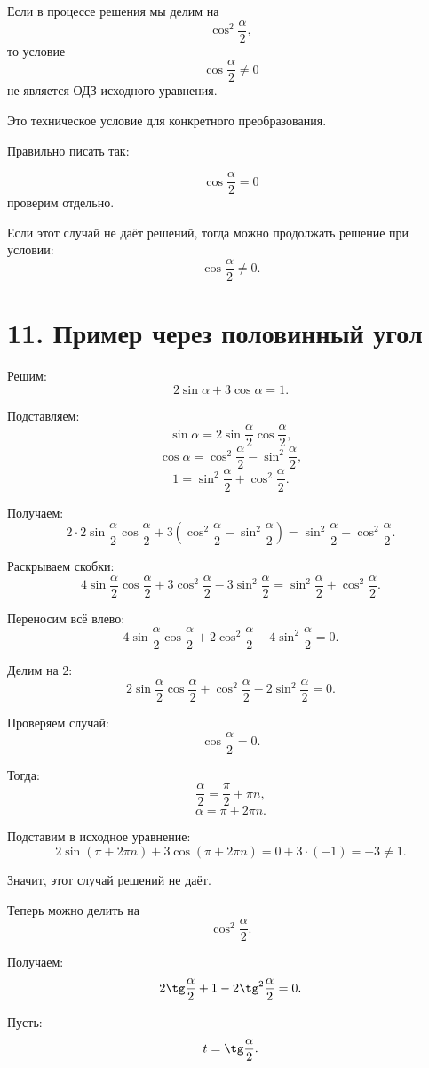 \documentclass[a4paper,12pt]{article}
\begin{document}
Если в процессе решения мы делим на
\[
\cos^2\frac{\alpha}{2},
\]
то условие
\[
\cos\frac{\alpha}{2}\ne0
\]
не является ОДЗ исходного уравнения.

Это техническое условие для конкретного преобразования.

Правильно писать так:

\[
\cos\frac{\alpha}{2}=0
\]
проверим отдельно.

Если этот случай не даёт решений, тогда можно продолжать решение при условии:
\[
\cos\frac{\alpha}{2}\ne0.
\]

\section*{11. Пример через половинный угол}

Решим:
\[
2\sin\alpha+3\cos\alpha=1.
\]

Подставляем:
\[
\sin\alpha=2\sin\frac{\alpha}{2}\cos\frac{\alpha}{2},
\]
\[
\cos\alpha=\cos^2\frac{\alpha}{2}-\sin^2\frac{\alpha}{2},
\]
\[
1=\sin^2\frac{\alpha}{2}+\cos^2\frac{\alpha}{2}.
\]

Получаем:
\[
2\cdot2\sin\frac{\alpha}{2}\cos\frac{\alpha}{2}
+
3\left(
\cos^2\frac{\alpha}{2}
-
\sin^2\frac{\alpha}{2}
\right)
=
\sin^2\frac{\alpha}{2}+\cos^2\frac{\alpha}{2}.
\]

Раскрываем скобки:
\[
4\sin\frac{\alpha}{2}\cos\frac{\alpha}{2}
+
3\cos^2\frac{\alpha}{2}
-
3\sin^2\frac{\alpha}{2}
=
\sin^2\frac{\alpha}{2}+\cos^2\frac{\alpha}{2}.
\]

Переносим всё влево:
\[
4\sin\frac{\alpha}{2}\cos\frac{\alpha}{2}
+
2\cos^2\frac{\alpha}{2}
-
4\sin^2\frac{\alpha}{2}
=0.
\]

Делим на \(2\):
\[
2\sin\frac{\alpha}{2}\cos\frac{\alpha}{2}
+
\cos^2\frac{\alpha}{2}
-
2\sin^2\frac{\alpha}{2}
=0.
\]

Проверяем случай:
\[
\cos\frac{\alpha}{2}=0.
\]

Тогда:
\[
\frac{\alpha}{2}=\frac{\pi}{2}+\pi n,
\]
\[
\alpha=\pi+2\pi n.
\]

Подставим в исходное уравнение:
\[
2\sin(\pi+2\pi n)+3\cos(\pi+2\pi n)=0+3\cdot(-1)=-3\ne1.
\]

Значит, этот случай решений не даёт.

Теперь можно делить на
\[
\cos^2\frac{\alpha}{2}.
\]

Получаем:
\[
2\tg\frac{\alpha}{2}
+
1
-
2\tg^2\frac{\alpha}{2}
=0.
\]

Пусть:
\[
t=\tg\frac{\alpha}{2}.
\]
\end{document}
